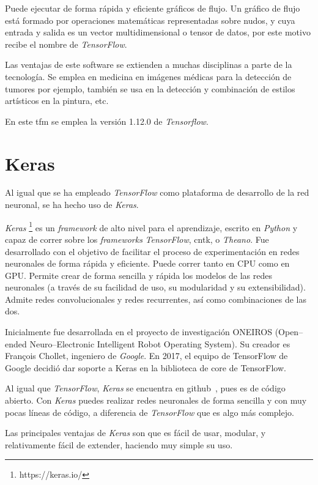 Puede ejecutar de forma rápida y eficiente gráficos de flujo. Un gráfico de flujo está formado por operaciones matemáticas representadas sobre nudos, y cuya entrada y salida es un vector multidimensional o tensor de datos, por este motivo recibe el nombre de \textit{TensorFlow}.

Las ventajas de este software se extienden a muchas disciplinas a parte de la tecnología. Se emplea en medicina en imágenes médicas para la detección de tumores por ejemplo, también se usa en la detección y combinación de estilos artísticos en la pintura, etc.

En este \acrshort{tfm} se emplea la versión 1.12.0 de \textit{Tensorflow}.

\section{Keras}

Al igual que se ha empleado \textit{TensorFlow} como plataforma de desarrollo de la red neuronal, se ha hecho uso de \textit{Keras}.

\textit{Keras} \footnote{https://keras.io/} es un \textit{framework} de alto nivel para el aprendizaje, escrito en \textit{Python} y capaz de correr sobre los \textit{frameworks} \textit{TensorFlow}, \acrshort{cntk}, o \textit{Theano}. Fue desarrollado con el objetivo de facilitar el proceso de experimentación en redes neuronales de forma rápida y eficiente. Puede correr tanto en CPU como en GPU. Permite crear de forma sencilla y rápida los modelos de las redes neuronales (a través de su facilidad de uso, su modularidad y su extensibilidad). Admite redes convolucionales y redes recurrentes, así como combinaciones de las dos.

Inicialmente fue desarrollada en el proyecto de investigación ONEIROS (Open--ended Neuro--Electronic Intelligent Robot Operating System). Su creador es Fran\c{c}ois Chollet, ingeniero de \textit{Google}.
En 2017, el equipo de TensorFlow de Google decidió dar soporte a Keras en la biblioteca de core de TensorFlow.

Al igual que \textit{TensorFlow}, \textit{Keras} se encuentra en github~\cite{keras_github}, pues es de código abierto. Con \textit{Keras} puedes realizar redes neuronales de forma sencilla y con muy pocas líneas de código, a diferencia de \textit{TensorFlow} que es algo más complejo. 

Las principales ventajas de \textit{Keras} son que es fácil de usar, modular, y relativamente fácil de extender, haciendo muy simple su uso.

